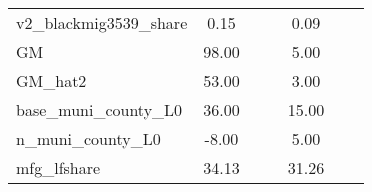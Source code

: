 \begin{table}[htbp]
\begin{tabular}{l*{2}{ccc}}
v2\_blackmig3539\_share&        0.15&            &            &        0.09&            &            \\
GM                  &       98.00&            &            &        5.00&            &            \\
GM\_hat2             &       53.00&            &            &        3.00&            &            \\
base\_muni\_county\_L0 &       36.00&            &            &       15.00&            &            \\
n\_muni\_county\_L0    &       -8.00&            &            &        5.00&            &            \\
mfg\_lfshare         &       34.13&            &            &       31.26&            &            \\
\bottomrule
\end{tabular}
\end{table}
